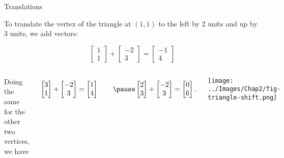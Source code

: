 \documentclass[xcoler=dvipsnames, aspectratio=169]{beamer}
\begin{document}
\begin{frame}{Translations}

To translate the vertex of the triangle at $(1,1)$  to the left by 2 units and up by 3 units, \alert{we add vectors}:

\[ \begin{bmatrix} 1 \\ 1\end{bmatrix} + \begin{bmatrix} -2 \\ 3 \end{bmatrix} = \begin{bmatrix} -1 \\ 4 \end{bmatrix}\]
    \pause

\begin{columns}

\column{0.5\tw}

Doing the same for the other two vertices, we have

\[ \begin{bmatrix} 3 \\ 1\end{bmatrix} + \begin{bmatrix} -2 \\ 3 \end{bmatrix} = \begin{bmatrix} 1 \\ 4 \end{bmatrix} \qquad\pause
\begin{bmatrix} 2 \\ 3\end{bmatrix} + \begin{bmatrix} -2 \\ 3 \end{bmatrix} = \begin{bmatrix} 0 \\ 6 \end{bmatrix}.\]


\column{0.5\tw}

\texttt{[image: ../Images/Chap2/fig-triangle-shift.png]}

\end{columns}

\end{frame}
\end{document}
